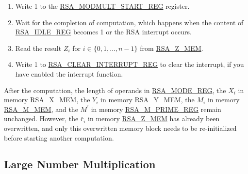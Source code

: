 \documentclass[main\_\_EN.tex]{subfiles}
\begin{document}
\begin{enumerate}
        Users need to write data to each memory block only according to the length of the number; data beyond this length are ignored.

    \item Write 1 to the \hyperref[regdesc:RSAMODMULTSTARTREG]{RSA\_MODMULT\_START\_REG} register.

    \item Wait for the completion of computation, which happens when the content of \hyperref[regdesc:RSAIDLEREG]{RSA\_IDLE\_REG} becomes 1 or the RSA interrupt occurs.
    
    \item Read the result \begin{math}Z_{i}\end{math} for \begin{math}i \in \{ 0, 1, \dots, n-1 \} \end{math} from \hyperref[regdesc:RSAmemory]{RSA\_Z\_MEM}.
    \item Write 1 to \hyperref[regdesc:RSACLEARINTERRUPTREG]{RSA\_CLEAR\_INTERRUPT\_REG} to clear the interrupt, if you have enabled the interrupt function.

\end{enumerate}

After the computation, the length of operands in \hyperref[regdesc:RSAMODEXPMODEREG]{RSA\_MODE\_REG}, the \begin{math}X_{i}\end{math} in memory \hyperref[regdesc:RSAmemory]{RSA\_X\_MEM}, the \begin{math}Y_{i}\end{math} in memory \hyperref[regdesc:RSAmemory]{RSA\_Y\_MEM}, the \begin{math}M_{i}\end{math} in memory \hyperref[regdesc:RSAmemory]{RSA\_M\_MEM}, and the \begin{math}M^{\prime}\end{math} in memory \hyperref[regdesc:RSAMPRIMEREG]{RSA\_M\_PRIME\_REG} remain unchanged. However, the \begin{math}\overline{r}_{i}\end{math} in memory \hyperref[regdesc:RSAmemory]{RSA\_Z\_MEM} has already been overwritten, and only this overwritten memory block needs to be re-initialized before starting another computation.

\subsection{Large Number Multiplication}
\end{document}
